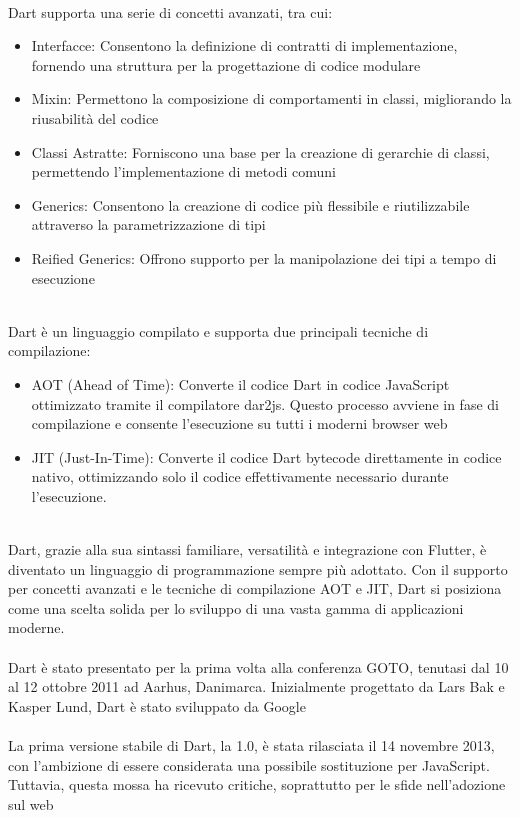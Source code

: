 \documentclass{report}
\begin{document}
\\
Dart supporta una serie di concetti avanzati, tra cui:
\\
\begin{itemize}
  \item{Interfacce: Consentono la definizione di contratti di implementazione, fornendo una struttura per la progettazione di codice modulare}
  \item{Mixin: Permettono la composizione di comportamenti in classi, migliorando la riusabilità del codice}
  \item{Classi Astratte: Forniscono una base per la creazione di gerarchie di classi, permettendo l'implementazione di metodi comuni}
  \item{Generics: Consentono la creazione di codice più flessibile e riutilizzabile attraverso la parametrizzazione di tipi}
  \item{Reified Generics: Offrono supporto per la manipolazione dei tipi a tempo di esecuzione}
\end{itemize}
\\
Dart è un linguaggio compilato e supporta due principali tecniche di compilazione:
\\
\begin{itemize}
  \item{AOT (Ahead of Time): Converte il codice Dart in codice JavaScript ottimizzato tramite il compilatore dar2js. Questo processo avviene in fase di compilazione e consente l'esecuzione su tutti i moderni browser web}
  \item{JIT (Just-In-Time): Converte il codice Dart bytecode direttamente in codice nativo, ottimizzando solo il codice effettivamente necessario durante l'esecuzione.}
\end{itemize}
\\
Dart, grazie alla sua sintassi familiare, versatilità e integrazione con Flutter, è diventato un linguaggio di programmazione sempre più adottato. Con il supporto per concetti avanzati e le tecniche di compilazione AOT e JIT, Dart si posiziona come una scelta solida per lo sviluppo di una vasta gamma di applicazioni moderne.
\\
\\
Dart è stato presentato per la prima volta alla conferenza GOTO, tenutasi dal 10 al 12 ottobre 2011 ad Aarhus, Danimarca. Inizialmente progettato da Lars Bak e Kasper Lund, Dart è stato sviluppato da Google
\\
\\
La prima versione stabile di Dart, la 1.0, è stata rilasciata il 14 novembre 2013, con l'ambizione di essere considerata una possibile sostituzione per JavaScript. Tuttavia, questa mossa ha ricevuto critiche, soprattutto per le sfide nell'adozione sul web
\end{document}
